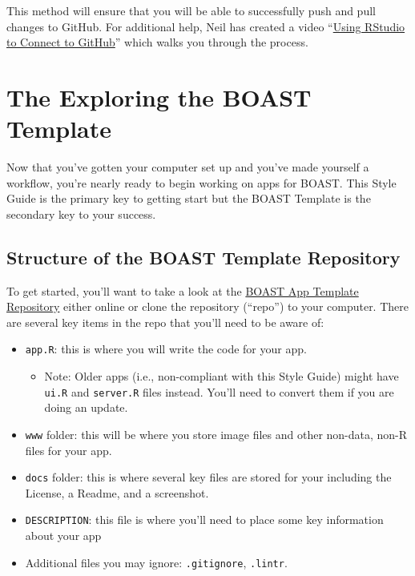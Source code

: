 \documentclass[
]{book}
\providecommand{\tightlist}{%
  \setlength{\itemsep}{0pt}\setlength{\parskip}{0pt}}
\begin{document}
This method will ensure that you will be able to successfully push and pull changes to GitHub. For additional help, Neil has created a video ``\href{https://youtu.be/IK0SiEz5vjs}{Using RStudio to Connect to GitHub}'' which walks you through the process.

\hypertarget{template}{%
\chapter{The Exploring the BOAST Template}\label{template}}

Now that you've gotten your computer set up and you've made yourself a workflow, you're nearly ready to begin working on apps for BOAST. This Style Guide is the primary key to getting start but the BOAST Template is the secondary key to your success.

\hypertarget{templateRepo}{%
\section{Structure of the BOAST Template Repository}\label{templateRepo}}

To get started, you'll want to take a look at the \href{https://github.com/EducationShinyAppTeam/App_Template}{BOAST App Template Repository} either online or clone the repository (``repo'') to your computer. There are several key items in the repo that you'll need to be aware of:

\begin{itemize}
\tightlist
\item
  \texttt{app.R}: this is where you will write the code for your app.

  \begin{itemize}
  \tightlist
  \item
    Note: Older apps (i.e., non-compliant with this Style Guide) might have \texttt{ui.R} and \texttt{server.R} files instead. You'll need to convert them if you are doing an update.
  \end{itemize}
\item
  \texttt{www} folder: this will be where you store image files and other non-data, non-R files for your app.
\item
  \texttt{docs} folder: this is where several key files are stored for your including the License, a Readme, and a screenshot.
\item
  \texttt{DESCRIPTION}: this file is where you'll need to place some key information about your app
\item
  Additional files you may ignore: \texttt{.gitignore}, \texttt{.lintr}.
\end{itemize}
\end{document}
